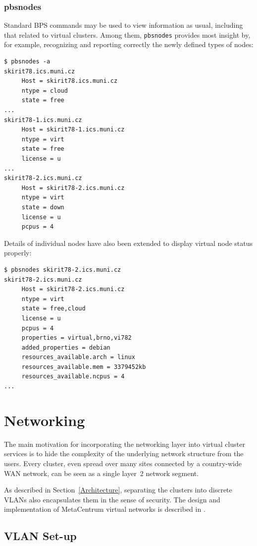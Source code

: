 \documentclass[a4paper]{article}
\begin{document}
\subsubsection{pbsnodes}

Standard BPS commands may be used to view information as usual, including that related to virtual clusters. Among them, \texttt{pbsnodes} provides most insight by, for example, recognizing and reporting correctly the newly defined types of nodes:

\begin{verbatim}
$ pbsnodes -a
skirit78.ics.muni.cz
     Host = skirit78.ics.muni.cz
     ntype = cloud
     state = free
...
skirit78-1.ics.muni.cz
     Host = skirit78-1.ics.muni.cz
     ntype = virt
     state = free
     license = u
...
skirit78-2.ics.muni.cz
     Host = skirit78-2.ics.muni.cz
     ntype = virt
     state = down
     license = u
     pcpus = 4
\end{verbatim}

Details of individual nodes have also been extended to display virtual node status properly:

\begin{verbatim}
$ pbsnodes skirit78-2.ics.muni.cz
skirit78-2.ics.muni.cz
     Host = skirit78-2.ics.muni.cz
     ntype = virt
     state = free,cloud
     license = u
     pcpus = 4
     properties = virtual,brno,vi782
     added_properties = debian
     resources_available.arch = linux
     resources_available.mem = 3379452kb
     resources_available.ncpus = 4
...
\end{verbatim}

\section{Networking}
\label{sec:net}
The main motivation for incorporating the networking layer into virtual
cluster services is to hide the complexity of the underlying network
structure from the users. Every cluster, even spread over many sites
connected by a country-wide WAN network, can be seen as a single layer~2 network
segment. 

As described in Section~\ref{Architecture}, separating the clusters
into discrete VLANs also encapsulates them in the sense of security.
The design and implementation of MetaCentrum virtual networks
is described in \cite{VirtCloud-CGW08, sbf}.

\subsection{VLAN Set-up}
\end{document}
